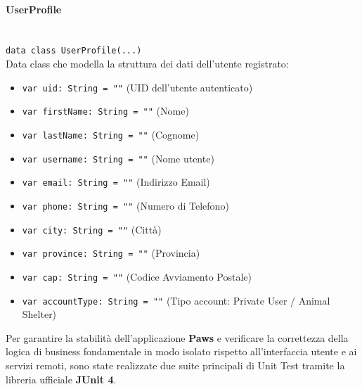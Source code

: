 \documentclass[a4paper]{report}
\begin{document}
\paragraph*{UserProfile} \mbox{}\\[0.1cm]
\texttt{data class UserProfile(...)} \\
Data class che modella la struttura dei dati dell'utente registrato:
\begin{itemize}
    \item \texttt{var uid: String = ""} (UID dell'utente autenticato)
    \item \texttt{var firstName: String = ""} (Nome)
    \item \texttt{var lastName: String = ""} (Cognome)
    \item \texttt{var username: String = ""} (Nome utente)
    \item \texttt{var email: String = ""} (Indirizzo Email)
    \item \texttt{var phone: String = ""} (Numero di Telefono)
    \item \texttt{var city: String = ""} (Città)
    \item \texttt{var province: String = ""} (Provincia)
    \item \texttt{var cap: String = ""} (Codice Avviamento Postale)
    \item \texttt{var accountType: String = ""} (Tipo account: Private User / Animal Shelter)
\end{itemize}

\clearpage
{}
Per garantire la stabilità dell'applicazione \textbf{Paws} e verificare la correttezza della logica di business fondamentale in modo isolato rispetto all'interfaccia utente e ai servizi remoti, sono state realizzate due suite principali di Unit Test tramite la libreria ufficiale \textbf{JUnit 4}.
\end{document}
